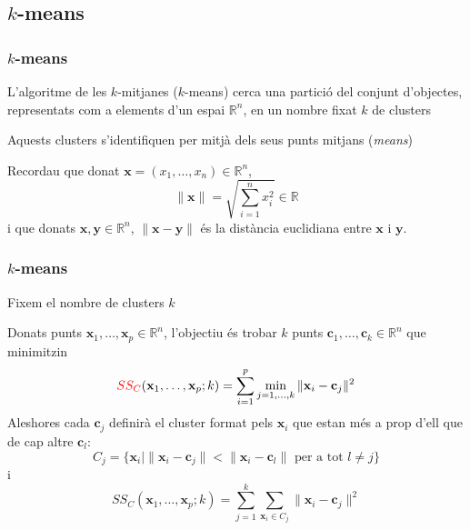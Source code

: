 \documentclass[12pt,t]{beamer}
\newcommand{\red}[1]{\textcolor{red}{#1}}
\renewcommand{\emph}[1]{{\color{red}#1}}
\newcommand{\RR}{\mathbb{R}}
\theoremstyle{plain}
\theoremstyle{definition}
\begin{document}
\subsection{$k$-means}

\begin{frame}
\frametitle{$k$-means}

L'algoritme de les $k$-mitjanes (\emph{$k$-means}) cerca una partició del conjunt d'objectes, representats com a elements d'un espai $\RR^n$, en un nombre fixat $k$ de clusters
\medskip

Aquests clusters s'identifiquen per mitjà dels seus punts mitjans (\textsl{means})
\vspace*{0.8cm}

Recordau que donat $\mathbf{x}=(x_1,\ldots,x_n)\in \RR^n$,
$$
\|\mathbf{x}\|=\sqrt{\sum_{i=1}^n x_i^2}\in \RR
$$
i que donats $\mathbf{x},\mathbf{y} \in \RR^n$, $\|\mathbf{x}-\mathbf{y}\|$ és la \emph{distància euclidiana} entre 
$\mathbf{x}$ i $\mathbf{y}$.
\end{frame}


\begin{frame}
\frametitle{$k$-means}
Fixem el nombre de clusters $k$
\medskip

Donats punts $\mathbf{x}_1,\ldots,\mathbf{x}_p\in \RR^n$, l'objectiu és trobar $k$ punts $\mathbf{c}_1,\ldots,\mathbf{c}_k\in \RR^n$ que minimitzin
$$
\red{SS_C}(\mathbf{x}_1,\ldots,\mathbf{x}_p; k)=\sum_{i=1}^p\min_{j=1,\ldots,k} \|\mathbf{x}_i-\mathbf{c}_j\|^2
$$
Aleshores cada $\mathbf{c}_j$ definirà el cluster format pels $\mathbf{x}_i$ que estan més a prop d'ell que de cap altre $\mathbf{c}_l$:
$$
C_j=\{\mathbf{x}_i\mid \|\mathbf{x}_i-\mathbf{c}_j\|<\|\mathbf{x}_i-\mathbf{c}_l\|\mbox{ per a tot }l\neq j\}
$$
i
$$
SS_C(\mathbf{x}_1,\ldots,\mathbf{x}_p; k)=\sum_{j=1}^k\sum_{\mathbf{x}_i\in C_j}  \|\mathbf{x}_i-\mathbf{c}_j\|^2
$$

\end{frame}
\end{document}
